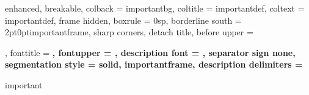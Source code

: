 \usepackage{xifthen}
\usepackage{tcolorbox}
\usepackage{theoremref}
\usepackage{enumitem}
\usepackage{bookmark}
\usepackage{comment}
\usepackage{xcolor}
\usepackage{transparent}
\usepackage{varwidth}
\usepackage{multicol}
\usepackage{import}
\usepackage{pdfpages}
\usepackage{titletoc}
\usepackage{lmodern}

\usepackage{amsmath,amsfonts,amsthm,amssymb,mathtools}
\usepackage[varbb]{newpxmath}
\usepackage[makeroom]{cancel}
\usepackage{xfrac}
\usepackage{array}

\usepackage{hyperref}

\usepackage[polish]{babel}
\usepackage[utf8]{inputenc}
\usepackage[T1]{fontenc}

\setlength{\parindent}{1cm}%

\addto\captionspolish{\renewcommand{\figurename}{Ilustracja}}
\addto\captionspolish{\renewcommand{\chaptername}{Temat}}
\addto\captionspolish{\renewcommand{\contentsname}{Spis zadań.}}




{%
  enhanced,
  breakable,
  colback = importantbg,
  coltitle = importantdef,
  coltext = importantdef,
  frame hidden,
  boxrule = 0sp,
  borderline south = {2pt}{0pt}{importantframe},
  sharp corners,
  detach title,
  before upper = \tcbtitle\par\smallskip,
  fonttitle = \selectfont\bfseries,
  fontupper = \selectfont\bfseries,
  description font = \mdseries,
  separator sign none,
  segmentation style = {solid, importantframe},
  description delimiters = {\flqq}{\frqq}
}
{important}

\newcommand{\imp}[1]
{%
  \begin{Important*}{Important}{}
    #1
  \end{Important*}
}%



